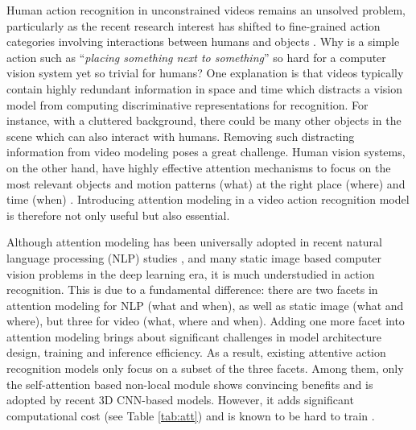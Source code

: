 \documentclass[runningheads]{llncs}
\begin{document}
Human action recognition in unconstrained videos remains 
an unsolved problem, particularly as the recent research interest has shifted to fine-grained action categories involving interactions between humans and objects \cite{damen2018scaling,goyal2017something,mahdisoltani2018fine,zhang2018egogesture}.  Why is a simple action such as ``{\em placing something next to something}'' so hard for a computer vision system yet so trivial for humans? One explanation is that 
videos typically contain highly redundant information in space and time which distracts a vision model from computing discriminative representations for recognition. For instance, with a cluttered background, there could be many other objects in the scene which can also interact with humans. Removing such distracting information from video modeling poses a great challenge.  Human vision systems, on the other hand, have highly effective attention mechanisms to focus on the most relevant objects and motion patterns (what) at the right place (where) and time (when) \cite{Rensink2000humanAttention}. Introducing attention modeling in a video action recognition model is therefore not only useful but also essential. 

Although attention modeling has been universally adopted in recent natural language processing (NLP) studies \cite{bahdanau2014neural,devlin-etal-2019-bert,gehring2017convolutional,luong2015effective,vaswani2017attention},
and many static image based computer vision problems
\cite{fu2019dual,gu2018learning,huang2019ccnet,park2018bam,woo2018cbam} in the deep learning era, it is much understudied in action recognition. This is due to a fundamental difference: there are two facets in attention modeling for NLP (what and when), as well as static image (what and where), but three for video (what, where and when). Adding one more facet into attention modeling brings about significant challenges in model architecture design, training and inference efficiency. As a result, existing attentive action recognition models \cite{du2017recurrent,li2018videolstm,meng2019interpretable,wang2018non,wang2016hierarchical} only focus on a subset of the three facets. Among them, only the self-attention based non-local module \cite{wang2018non} shows convincing benefits and is  adopted by recent 3D CNN-based models. However, it adds significant computational cost (see Table \ref{tab:att}) and is known to be hard to train \cite{Tao2018nonlocalproblem}.  
\end{document}
